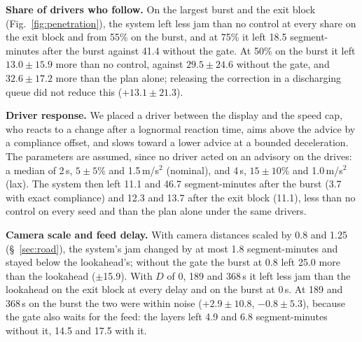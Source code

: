 \noindent\textbf{Share of drivers who follow.} On the largest burst and the exit block (Fig.~\ref{fig:penetration}), the system left less jam than no control at every share on the exit block and from 55\% on the burst, and at 75\% it left 18.5 segment-minutes after the burst against 41.4 without the gate. At 50\% on the burst it left $13.0\pm15.9$ more than no control, against $29.5\pm24.6$ without the gate, and $32.6\pm17.2$ more than the plan alone; releasing the correction in a discharging queue did not reduce this ($+13.1\pm21.3$).

\noindent\textbf{Driver response.} We placed a driver between the display and the speed cap, who reacts to a change after a lognormal reaction time, aims above the advice by a compliance offset, and slows toward a lower advice at a bounded deceleration. The parameters are assumed, since no driver acted on an advisory on the drives: a median of 2\,s, $5\pm5\%$ and 1.5\,m/s$^2$ (nominal), and 4\,s, $15\pm10\%$ and 1.0\,m/s$^2$ (lax). The system then left 11.1 and 46.7 segment-minutes after the burst (3.7 with exact compliance) and 12.3 and 13.7 after the exit block (11.1), less than no control on every seed and than the plan alone under the same drivers.

\noindent\textbf{Camera scale and feed delay.} With camera distances scaled by 0.8 and 1.25 (\S~\ref{sec:road}), the system's jam changed by at most 1.8 segment-minutes and stayed below the lookahead's; without the gate the burst at 0.8 left 25.0 more than the lookahead ($\pm$15.9). With $D$ of 0, 189 and 368\,s it left less jam than the lookahead on the exit block at every delay and on the burst at 0\,s. At 189 and 368\,s on the burst the two were within noise ($+2.9\pm10.8$, $-0.8\pm5.3$), because the gate also waits for the feed: the layers left 4.9 and 6.8 segment-minutes without it, 14.5 and 17.5 with it.
